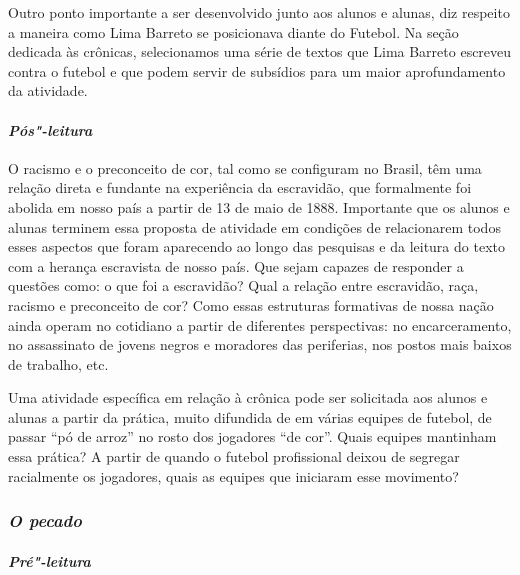 \documentclass{extarticle}
\begin{document}
Outro ponto importante a ser desenvolvido junto aos alunos e alunas,
diz respeito a maneira como Lima Barreto se posicionava diante do
Futebol. Na seção dedicada às crônicas, selecionamos uma série de textos
que Lima Barreto escreveu contra o futebol e que podem servir de
subsídios para um maior aprofundamento da atividade.






\paragraph{\textit{Pós"-leitura}}

O racismo e o preconceito de cor, tal como se configuram no Brasil,
têm uma relação direta e fundante na experiência da escravidão, que
formalmente foi abolida em nosso país a partir de 13 de maio de 1888.
Importante que os alunos e alunas terminem essa proposta de atividade em
condições de relacionarem todos esses aspectos que foram aparecendo ao
longo das pesquisas e da leitura do texto com a herança escravista de
nosso país. Que sejam capazes de responder a questões como: o que foi a
escravidão? Qual a relação entre escravidão, raça, racismo e preconceito
de cor? Como essas estruturas formativas de nossa nação ainda operam no
cotidiano a partir de diferentes perspectivas: no encarceramento, no
assassinato de jovens negros e moradores das periferias, nos postos mais
baixos de trabalho, etc.

Uma atividade específica em relação à crônica pode ser solicitada aos
alunos e alunas a partir da prática, muito difundida de em várias
equipes de futebol, de passar ``pó de arroz'' no rosto dos jogadores
``de cor''. Quais equipes mantinham essa prática? A partir de quando o
futebol profissional deixou de segregar racialmente os jogadores, quais
as equipes que iniciaram esse movimento?


\subsubsection{\textit{O pecado}}

\paragraph{\textit{Pré"-leitura}}
\end{document}
